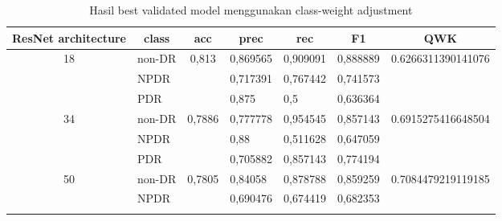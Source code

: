     \begin{table}[h!]
        \begin{center}
        \caption{Hasil best validated model menggunakan class-weight adjustment}
        \label{tb:HasilValClassWeight}
            \begin{tabular}{|c|l|c|l|l|l|c|}
            \hline
            ResNet   architecture & \multicolumn{1}{c|}{class} & acc                     & \multicolumn{1}{c|}{prec} & \multicolumn{1}{c|}{rec} & \multicolumn{1}{c|}{F1} & QWK                                 \\ \hline
            \multirow{3}{*}{18}   & non-DR                     & \multirow{3}{*}{0,813}  & 0,869565                  & 0,909091                 & 0,888889                & \multirow{3}{*}{0.6266311390141076} \\ \cline{2-2} \cline{4-6}
                                  & NPDR                       &                         & 0,717391                  & 0,767442                 & 0,741573                &                                     \\ \cline{2-2} \cline{4-6}
                                  & PDR                        &                         & 0,875                     & 0,5                      & 0,636364                &                                     \\ \hline
            \multirow{3}{*}{34}   & non-DR                     & \multirow{3}{*}{0,7886} & 0,777778                  & 0,954545                 & 0,857143                & \multirow{3}{*}{0.6915275416648504} \\ \cline{2-2} \cline{4-6}
                                  & NPDR                       &                         & 0,88                      & 0,511628                 & 0,647059                &                                     \\ \cline{2-2} \cline{4-6}
                                  & PDR                        &                         & 0,705882                  & 0,857143                 & 0,774194                &                                     \\ \hline
            \multirow{3}{*}{50}   & non-DR                     & \multirow{3}{*}{0,7805} & 0,84058                   & 0,878788                 & 0,859259                & \multirow{3}{*}{0.7084479219119185} \\ \cline{2-2} \cline{4-6}
                                  & NPDR                       &                         & 0,690476                  & 0,674419                 & 0,682353                &                                     \\ \cline{2-2} \cline{4-6}

\end{tabular}
\end{center}
\end{table}
